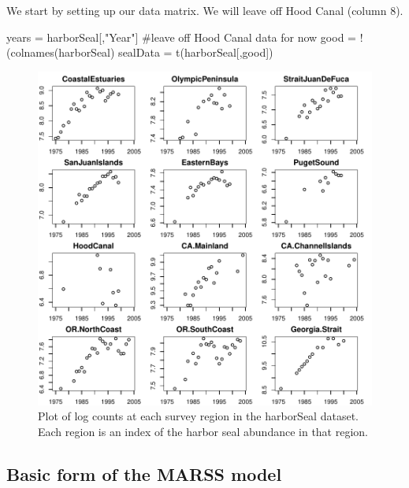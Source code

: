 We start by setting up our data matrix.  We will leave off Hood Canal (column 8).
\begin{Schunk}
\begin{Sinput}
 years = harborSeal[,"Year"]
 #leave off Hood Canal data for now
 good = !(colnames(harborSeal)%
 sealData = t(harborSeal[,good])
\end{Sinput}
\end{Schunk}

\begin{figure}[htp]
\begin{center}
\includegraphics{./figures/MSS--Cs02_fig1}
\end{center}
\caption{Plot of log counts at each survey region in the harborSeal dataset. Each region is an index of the harbor seal abundance in that region. }
\label{fig:harborSeal}
\end{figure}

\subsection{Basic form of the MARSS model}

